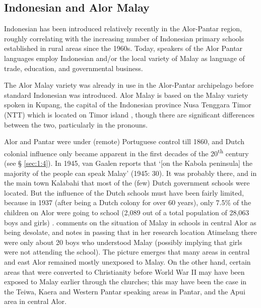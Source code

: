 \subsection{Indonesian and Alor Malay}\label{sec:1:2.3}
Indonesian has been introduced relatively recently in the Alor-Pantar region, roughly correlating with the increasing number of Indonesian primary schools established in rural areas since the 1960s. Today, speakers of the Alor Pantar languages employ Indonesian and/or the local variety of Malay as language of trade, education, and governmental business. 

The Alor Malay variety was already in use in the Alor-Pantar archipelago before standard Indonesian was introduced. Alor Malay is based on the Malay variety spoken in Kupang, the capital of the Indonesian province Nusa Tenggara Timor (NTT) which is located on Timor island \citep{JacobEtAl2003,BairdEtAlMs}, though there are significant differences between the two, particularly in the pronouns. 

Alor and Pantar were under (remote) Portuguese control till 1860, and Dutch colonial influence only became apparent in the first decades of the 20\textsuperscript{th} century (see {\S} \ref{sec:1:4}). In 1945, van Gaalen reports that `[on the Kabola peninsula] the majority of the people can speak Malay' (1945: 30). It was probably there, and in the main town Kalabahi that most of the (few) Dutch government schools were located. But the influence of the Dutch schools must have been fairly limited, because in 1937 (after being a Dutch colony for over 60 years), only 7.5\% of the children on Alor were going to school (2,089 out of a total population of 28,063 boys and girls) \citep[24, 41a]{VanGaalen1945}. \citet[17]{DuBois1960} comments on the situation of Malay in schools in central Alor as being desolate, and notes in passing that in her research location Atimelang there were only about 20 boys who understood Malay (possibly implying that girls were not attending the school). The picture emerges that many areas in central and east Alor remained mostly unexposed to Malay. On the other hand, certain areas that were converted to Christianity before World War II may have been exposed to Malay earlier through the churches; this may have been the case in the Teiwa, Kaera and Western Pantar speaking areas in Pantar, and the Apui area in central Alor. 

